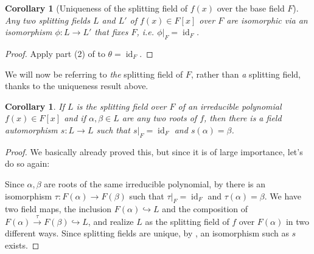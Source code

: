 \documentclass[12pt]{report}
\newtheorem{corollary}[theorem]{Corollary}
\numberwithin{equation}{section}
\numberwithin{theorem}{chapter}
\theoremstyle{definition}
\newtheorem*{basic properties}{Basic Properties}
\newtheorem*{Important Remark}{Important Remark}
\DeclareMathOperator{\id}{id}
\begin{document}


\begin{corollary}[Uniqueness of the splitting field of $f(x)$ over the base field $F$]\label{uniqueness of splitting fields}
Any two splitting fields $L$ and $L'$ of $f(x) \in F[x]$ over $F$ are isomorphic  via an isomorphism $\phi:L\to L'$ that fixes $F$, i.e. $\phi|_F=\id_F$.
\end{corollary}

\begin{proof}
Apply part (2) of  to $\theta=\id_F$.
\end{proof}

We will now be referring to \emph{the} splitting field of $F$, rather than \emph{a} splitting field, thanks to the uniqueness result above.


\begin{corollary}\label{por418}
If $L$ is the splitting field over $F$ of an irreducible polynomial $f(x) \in F[x]$ and if $\alpha, \beta \in L$ are any two roots of $f$, then there is a field automorphism $s\!: L \to L$ such that $s|_F = \id_F$ and $s(\alpha) = \beta$.
\end{corollary}

\begin{proof} 
We basically already proved this, but since it is of large importance, let's do so again:

Since $\alpha, \beta$ are roots of the same irreducible polynomial, by  there is an isomorphism $\tau: F(\alpha) \to F(\beta)$ such that $\tau|_F = \id_F$ and $\tau(\alpha) = \beta$.
We have two field maps, the inclusion $F(\alpha) \hookrightarrow L$ and the composition of $F(\alpha) \xrightarrow{\tau} F(\beta) \hookrightarrow L$, and realize $L$ as the splitting field of $f$ over $F(\alpha)$ in two different ways. Since splitting fields are unique, by , an isomorphism such as $s$ exists.
\end{proof}
\end{document}
